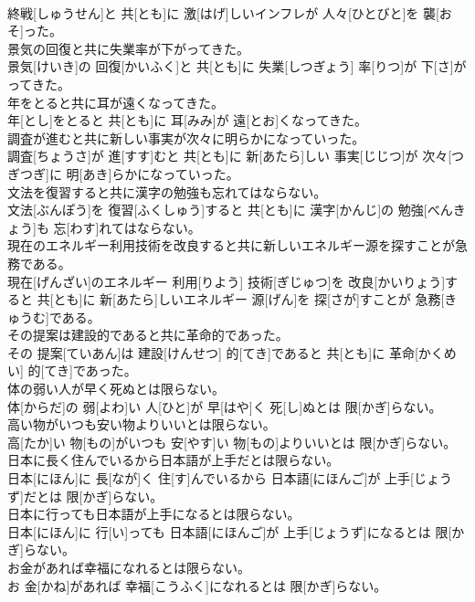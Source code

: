 \documentclass[8pt]{extreport}
\begin{document}
\begin{CJK}{UTF8}{min}
\\	終戦[しゅうせん]と 共[とも]に 激[はげ]しいインフレが 人々[ひとびと]を 襲[おそ]った。
\\	景気の回復と共に失業率が下がってきた。	
\\	景気[けいき]の 回復[かいふく]と 共[とも]に 失業[しつぎょう] 率[りつ]が 下[さ]がってきた。
\\	年をとると共に耳が遠くなってきた。	
\\	年[とし]をとると 共[とも]に 耳[みみ]が 遠[とお]くなってきた。
\\	調査が進むと共に新しい事実が次々に明らかになっていった。	
\\	調査[ちょうさ]が 進[すす]むと 共[とも]に 新[あたら]しい 事実[じじつ]が 次々[つぎつぎ]に 明[あき]らかになっていった。
\\	文法を復習すると共に漢字の勉強も忘れてはならない。	
\\	文法[ぶんぽう]を 復習[ふくしゅう]すると 共[とも]に 漢字[かんじ]の 勉強[べんきょう]も 忘[わす]れてはならない。
\\	現在のエネルギー利用技術を改良すると共に新しいエネルギー源を探すことが急務である。	
\\	現在[げんざい]のエネルギー 利用[りよう] 技術[ぎじゅつ]を 改良[かいりょう]すると 共[とも]に 新[あたら]しいエネルギー 源[げん]を 探[さが]すことが 急務[きゅうむ]である。
\\	その提案は建設的であると共に革命的であった。	
\\	その 提案[ていあん]は 建設[けんせつ] 的[てき]であると 共[とも]に 革命[かくめい] 的[てき]であった。
\\	体の弱い人が早く死ぬとは限らない。	
\\	体[からだ]の 弱[よわ]い 人[ひと]が 早[はや]く 死[し]ぬとは 限[かぎ]らない。
\\	高い物がいつも安い物よりいいとは限らない。	
\\	高[たか]い 物[もの]がいつも 安[やす]い 物[もの]よりいいとは 限[かぎ]らない。
\\	日本に長く住んでいるから日本語が上手だとは限らない。	
\\	日本[にほん]に 長[なが]く 住[す]んでいるから 日本語[にほんご]が 上手[じょうず]だとは 限[かぎ]らない。
\\	日本に行っても日本語が上手になるとは限らない。	
\\	日本[にほん]に 行[い]っても 日本語[にほんご]が 上手[じょうず]になるとは 限[かぎ]らない。
\\	お金があれば幸福になれるとは限らない。	
\\	お 金[かね]があれば 幸福[こうふく]になれるとは 限[かぎ]らない。

\end{CJK}
\end{document}
